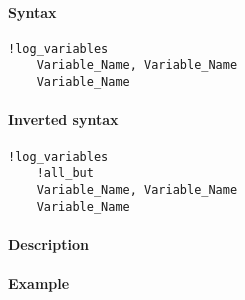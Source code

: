 


	\paragraph{Syntax}\label{syntax}

\begin{verbatim}
!log_variables
    Variable_Name, Variable_Name
    Variable_Name
\end{verbatim}

\paragraph{Inverted syntax}\label{inverted-syntax}

\begin{verbatim}
!log_variables
    !all_but
    Variable_Name, Variable_Name
    Variable_Name
\end{verbatim}

\paragraph{Description}\label{description}

\paragraph{Example}\label{example}


